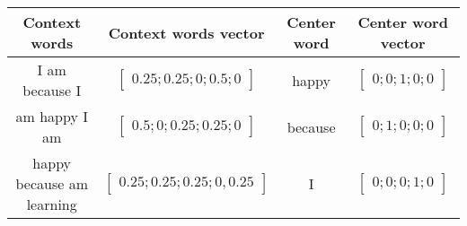 \documentclass[12pt]{article}
\begin{document}
\begin{table}[h]
  \begin{center}
    \begin{tabular}{c c c c}
      \hline
      Context words & Context words vector & Center word & Center word vector \\
      \hline
      I am because I & $\begin{bmatrix} 0.25; 0.25; 0; 0.5; 0 \end{bmatrix}$ &                                                                                                                                                                                                                                                                                                                                                                                                                                                                                                                                                                          happy & $\begin{bmatrix} 0; 0; 1; 0; 0 \end{bmatrix}$ \\
      am happy I am & $\begin{bmatrix} 0.5; 0; 0.25; 0.25; 0 \end{bmatrix}$ &                                                                                                                                                                                                                                                                                                                                                                                                                                                                                                                                                                                                                                                        because & $\begin{bmatrix} 0; 1; 0; 0; 0 \end{bmatrix}$ \\
      happy because am learning & $\begin{bmatrix} 0.25; 0.25; 0.25; 0, 0.25 \end{bmatrix}$ &                                                                                                                                                                                                                                                                                                                                                                                                                                                                                                                                                                                                                                  I & $\begin{bmatrix} 0; 0; 0; 1; 0 \end{bmatrix}$ \\
    \end{tabular}
  \end{center}
\end{table}
\end{document}
